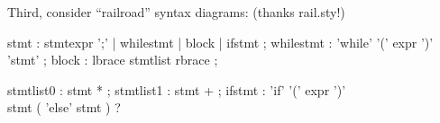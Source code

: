 \railparam{\setlength{\itemsep}{.2in}}
\railnontermfont{\rmfamily\itshape}
\railinit

\begin{slide*}
Third, consider ``railroad'' syntax diagrams: (thanks rail.sty!)
\begin{rail}
stmt : stmtexpr ';' | whilestmt | block | ifstmt ;
whilestmt : 'while' '(' expr ')' 'stmt' ;
block : lbrace stmtlist rbrace ;
\end{rail}
\vfil
\end{slide*}

\begin{slide*}
\begin{rail}
stmtlist0 : stmt * ;
stmtlist1 : stmt + ;
ifstmt : 'if' '(' expr ')' \\ stmt ( 'else' stmt ) ?
\end{rail}
\vfil
\end{slide*}

